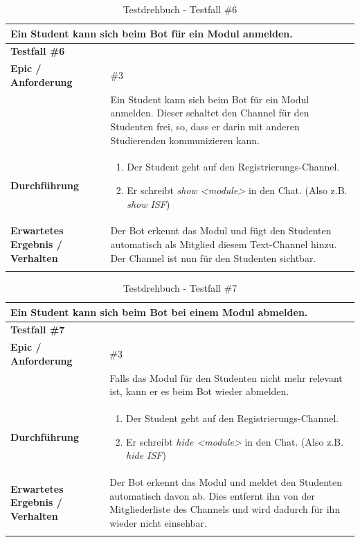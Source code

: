 \documentclass[a4paper, table]{article}
\begin{document}
\begin{longtable}[h]{|p{15em}|p{25em}|}
    \hline
    \multicolumn{2}{|l|}{\textbf{Ein Student kann sich beim Bot für ein Modul anmelden.}} \\
    \hline
    \multicolumn{2}{|l|}{\textbf{Testfall \#6}} \\
    \hline
    \textbf{Epic / Anforderung} & \#3 \\*
     & Ein Student kann sich beim Bot für ein Modul anmelden.
     Dieser schaltet den Channel für den Studenten frei, so, dass er darin mit anderen Studierenden kommunizieren kann. \\
    \hline
    \textbf{Durchführung} &
    \begin{enumerate}
        \item Der Student geht auf den Registrierungs-Channel.
        \item Er schreibt \textit{show <module>} in den Chat. (Also \gls{z.B.} \textit{show ISF})
    \end{enumerate}\\
    \hline
    \textbf{Erwartetes Ergebnis / Verhalten} & Der Bot erkennt das Modul und fügt den Studenten automatisch als Mitglied diesem Text-Channel hinzu.
    Der Channel ist nun für den Studenten sichtbar. \\
    \hline
    \caption{Testdrehbuch - Testfall \#6}
\end{longtable}

\begin{longtable}[h]{|p{15em}|p{25em}|}
    \hline
    \multicolumn{2}{|l|}{\textbf{Ein Student kann sich beim Bot bei einem Modul abmelden.}} \\
    \hline
    \multicolumn{2}{|l|}{\textbf{Testfall \#7}} \\
    \hline
    \textbf{Epic / Anforderung} & \#3 \\*
     & Falls das Modul für den Studenten nicht mehr relevant ist, kann er es beim Bot wieder abmelden. \\
    \hline
    \textbf{Durchführung} &
    \begin{enumerate}
        \item Der Student geht auf den Registrierungs-Channel.
        \item Er schreibt \textit{hide <module>} in den Chat. (Also \gls{z.B.} \textit{hide ISF})
    \end{enumerate}\\
    \hline
    \textbf{Erwartetes Ergebnis / Verhalten} & Der Bot erkennt das Modul und meldet den Studenten automatisch davon ab.
    Dies entfernt ihn von der Mitgliederliste des Channels und wird dadurch für ihn wieder nicht einsehbar. \\
    \hline
    \caption{Testdrehbuch - Testfall \#7}
\end{longtable}
\end{document}
